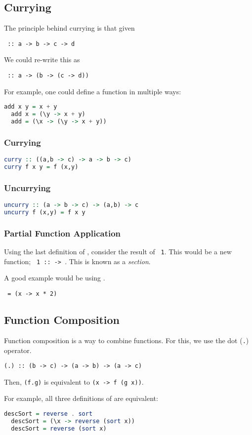 \subsection{Currying}
The principle behind currying is that given
\begin{center}
  \texttt{ :: a -> b -> c -> d}
\end{center}
We could re-write this as
\begin{center}
  \texttt{ :: a -> (b -> (c -> d))}
\end{center}

For example, one could define a function \texttt{} in multiple ways:
\begin{lstlisting}[language=haskell]
  add x y = x + y
  add x = (\y -> x + y)
  add = (\x -> (\y -> x + y))
\end{lstlisting}

\subsubsection{Currying}
\begin{lstlisting}[language=haskell]
curry :: ((a,b -> c) -> a -> b -> c)
curry f x y = f (x,y)
\end{lstlisting}

\subsubsection{Uncurrying}
\begin{lstlisting}[language=haskell]
uncurry :: (a -> b -> c) -> (a,b) -> c
uncurry f (x,y) = f x y
\end{lstlisting}

\subsubsection{Partial Function Application}
Using the last definition of \texttt{}, consider the result of \texttt{ 1}. This would be a new function; \texttt{ 1 ::  -> }. This is known as a \textit{section}.

A good example would be using \texttt{}.
\begin{center}
  \texttt{ =  (x -> x * 2)}
\end{center}

\subsection{Function Composition}
Function composition is a way to combine functions. For this, we use the dot (\texttt{.}) operator.
\begin{center}
  \texttt{(.) :: (b -> c) -> (a -> b) -> (a -> c)}
\end{center}
Then, \texttt{(f.g)} is equivalent to \texttt{(x -> f (g x))}.

For example, all three definitions of \texttt{} are equivalent:
\begin{lstlisting}[language=haskell]
  descSort = reverse . sort
  descSort = (\x -> reverse (sort x))
  descSort = reverse (sort x)
\end{lstlisting}
